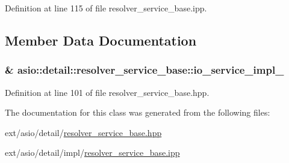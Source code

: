 Definition at line 115 of file resolver\+\_\+service\+\_\+base.\+ipp.



\subsection{Member Data Documentation}
\hypertarget{classasio_1_1detail_1_1resolver__service__base_ae43e2e86bff8660b2a9cd3736002365e}{}
\subsubsection[{io\+\_\+service\+\_\+impl\+\_\+}]{\& asio\+::detail\+::resolver\+\_\+service\+\_\+base\+::io\+\_\+service\+\_\+impl\+\_\+\hspace{0.3cm}{\ttfamily [protected]}}\label{classasio_1_1detail_1_1resolver__service__base_ae43e2e86bff8660b2a9cd3736002365e}


Definition at line 101 of file resolver\+\_\+service\+\_\+base.\+hpp.



The documentation for this class was generated from the following files\+:\begin{DoxyCompactItemize}
\item 
ext/asio/detail/\hyperlink{resolver__service__base_8hpp}{resolver\+\_\+service\+\_\+base.\+hpp}\item 
ext/asio/detail/impl/\hyperlink{resolver__service__base_8ipp}{resolver\+\_\+service\+\_\+base.\+ipp}\end{DoxyCompactItemize}
